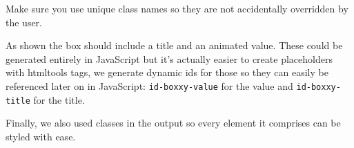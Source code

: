 \documentclass[10pt,]{krantz}
\makeatletter
\newenvironment{Shaded}{\begin{snugshade}}{\end{snugshade}}
\newcommand{\CommentTok}[1]{\textcolor[rgb]{0.37,0.37,0.37}{\textit{#1}}}
\newcommand{\ConstantTok}[1]{\textcolor[rgb]{0,0,0}{#1}}
\newcommand{\ControlFlowTok}[1]{\textcolor[rgb]{0.27,0.27,0.27}{\textbf{#1}}}
\newcommand{\DataTypeTok}[1]{\textcolor[rgb]{0.27,0.27,0.27}{#1}}
\newcommand{\DecValTok}[1]{\textcolor[rgb]{0.06,0.06,0.06}{#1}}
\newcommand{\FunctionTok}[1]{\textcolor[rgb]{0,0,0}{#1}}
\newcommand{\KeywordTok}[1]{\textcolor[rgb]{0.27,0.27,0.27}{\textbf{#1}}}
\newcommand{\NormalTok}[1]{#1}
\newcommand{\OperatorTok}[1]{\textcolor[rgb]{0.43,0.43,0.43}{\textbf{#1}}}
\newcommand{\StringTok}[1]{\textcolor[rgb]{0.5,0.5,0.5}{#1}}
\newenvironment{kframe}{%
\medskip{}
\setlength{\fboxsep}{.8em}
 \def\at@end@of@kframe{}%
 \ifinner\ifhmode%
  \def\at@end@of@kframe{\end{minipage}}%
  \begin{minipage}{\columnwidth}%
 \fi\fi%
 \def\FrameCommand##1{\hskip\@totalleftmargin \hskip-\fboxsep
 \colorbox{shadecolor}{##1}\hskip-\fboxsep
     \hskip-\linewidth \hskip-\@totalleftmargin \hskip\columnwidth}%
 \MakeFramed {\advance\hsize-\width
   \@totalleftmargin\z@ \linewidth\hsize
   \@setminipage}}%
 {\par\unskip\endMakeFramed%
 \at@end@of@kframe}
\renewenvironment{Shaded}{\begin{kframe}}{\end{kframe}}
\newenvironment{rmdblock}[1]
  {
  \begin{itemize}
  \renewcommand{\labelitemi}{
    \raisebox{-.7\height}[0pt][0pt]{
      {\setkeys{Gin}{width=3em,keepaspectratio}\texttt{[image: images/\#1]}}
    }
  }
  \setlength{\fboxsep}{1em}
  \begin{kframe}
  \item
  }
  {
  \end{kframe}
  \end{itemize}
  }
\newenvironment{rmdnote}
  {\begin{rmdblock}{note}}
  {\end{rmdblock}}
\makeatother
\begin{document}
\begin{rmdnote}
Make sure you use unique class names so they are not accidentally
overridden by the user.
\end{rmdnote}

As shown the box should include a title and an animated value. These could be generated entirely in JavaScript but it's actually easier to create placeholders with htmltools tags, we generate dynamic ids for those so they can easily be referenced later on in JavaScript: \texttt{id-boxxy-value} for the value and \texttt{id-boxxy-title} for the title.

\begin{Shaded}
\end{Shaded}

Finally, we also used classes in the output so every element it comprises can be styled with ease.

\begin{Shaded}
\end{Shaded}
\end{document}
